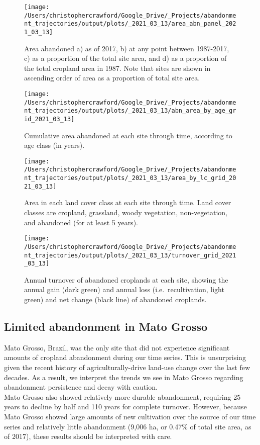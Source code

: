 \documentclass[9pt,twocolumn,twoside,lineno]{pnas-new}
\begin{document}
\begin{figure}
\texttt{[image: /Users/christophercrawford/Google\_Drive/\_Projects/abandonment\_trajectories/output/plots/\_2021\_03\_13/area\_abn\_panel\_2021\_03\_13]} \caption{Area abandoned a) as of 2017, b) at any point between 1987-2017, c) as a proportion of the total site area, and d) as a proportion of the total cropland area in 1987. Note that sites are shown in ascending order of area as a proportion of total site area.}\label{fig:area-abn-panel}
\end{figure}



\begin{figure}
\texttt{[image: /Users/christophercrawford/Google\_Drive/\_Projects/abandonment\_trajectories/output/plots/\_2021\_03\_13/abn\_area\_by\_age\_grid\_2021\_03\_13]} \caption{Cumulative area abandoned at each site through time, according to age class (in years).}\label{fig:area-abn-by-age-class}
\end{figure}



\begin{figure}
\texttt{[image: /Users/christophercrawford/Google\_Drive/\_Projects/abandonment\_trajectories/output/plots/\_2021\_03\_13/area\_by\_lc\_grid\_2021\_03\_13]} \caption{Area in each land cover class at each site through time. Land cover classes are cropland, grassland, woody vegetation, non-vegetation, and abandoned (for at least 5 years).}\label{fig:area-by-lc}
\end{figure}



\begin{figure}
\texttt{[image: /Users/christophercrawford/Google\_Drive/\_Projects/abandonment\_trajectories/output/plots/\_2021\_03\_13/turnover\_grid\_2021\_03\_13]} \caption{Annual turnover of abandoned croplands at each site, showing the annual gain (dark green) and annual loss (i.e.~recultivation, light green) and net change (black line) of abandoned croplands.}\label{fig:turnover-grid}
\end{figure}

\hypertarget{mato-grosso}{%
\subsection{Limited abandonment in Mato Grosso}\label{mato-grosso}}

Mato Grosso, Brazil, was the only site that did not experience significant amounts of cropland abandonment during our time series.
This is unsurprising given the recent history of agriculturally-drive land-use change over the last few decades.
As a result, we interpret the trends we see in Mato Grosso regarding abandonment persistence and decay with caution.\\
Mato Grosso also showed relatively more durable abandonment, requiring 25 years to decline by half and 110 years for complete turnover.
However, because Mato Grosso showed large amounts of new cultivation over the source of our time series and relatively little abandonment (9,006 ha, or 0.47\% of total site area, as of 2017), these results should be interpreted with care.
\end{document}
